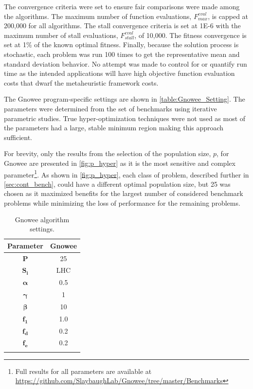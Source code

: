 \documentclass{article}                                                                           %
\begin{document}
The convergence criteria were set to ensure fair comparisons were made among the algorithms.
The maximum number of function evaluations, $F^{eval}_{max}$, is capped at 200,000 for all algorithms.
The stall convergence criteria is set at 1E-6 with the maximum number of stall evaluations, $F^{eval}_{stall}$, of 10,000.  
The fitness convergence is set at 1\% of the known optimal fitness.  
Finally, because the solution process is stochastic, each problem was run 100 times to get the representative mean and standard deviation behavior. 
No attempt was made to control for or quantify run time as the intended applications will have high objective function evaluation costs that dwarf the metaheuristic framework costs. 

The Gnowee program-specific settings are shown in \autoref{table:Gnowee_Setting}.
The parameters were determined from the set of benchmarks using iterative parametric studies.
True hyper-optimization techniques were not used as most of the parameters had a large, stable minimum region making this approach sufficient.  

For brevity, only the results from the selection of the population size, $p$, for Gnowee are presented in \autoref{fig:p_hyper} as it is the most sensitive and complex parameter\footnote{Full results for all parameters are available at \url{https://github.com/SlaybaughLab/Gnowee/tree/master/Benchmarks}}. 
As shown in \autoref{fig:p_hyper}, each class of problem, described further in \autoref{sec:cont_bench}, could have a different optimal population size, but 25 was chosen as it maximized benefits for the largest number of considered benchmark problems while minimizing the loss of performance for the remaining problems.  

\begin{table}[!t]
\centering
\caption{Gnowee algorithm settings.} 
\label{table:Gnowee_Setting}
\begin{tabular}{c c }
\toprule
\textbf{Parameter}  & \textbf{Gnowee} \\
\midrule
$\boldsymbol{P}$ & 25 \\ \addlinespace
$\boldsymbol{S_i}$ & LHC \\ \addlinespace
$\boldsymbol{\alpha}$ & 0.5 \\ \addlinespace
$\boldsymbol{\gamma}$ & 1 \\ \addlinespace
$\boldsymbol{\beta}$ & 10 \\ \addlinespace
$\boldsymbol{f_1}$ & 1.0 \\ \addlinespace
$\boldsymbol{f_d}$ & 0.2 \\ \addlinespace
$\boldsymbol{f_e}$ & 0.2 \\ \addlinespace
\bottomrule
\end{tabular}
\end{table}
\end{document}
